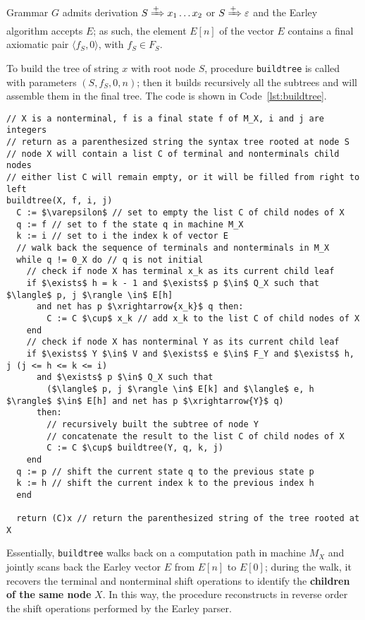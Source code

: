 \documentclass[english]{article}
\begin{document}
Grammar \(G\) admits derivation \(S \xRightarrow{+} x_1 \ldots x_2\) or \(S \xRightarrow{+} \varepsilon\) and the Earley algorithm accepts \(E\);
as such, the element \(E[n]\) of the vector \(E\) contains a final axiomatic pair \(\langle f_S, 0 \rangle\), with \(f_S \in F_S\).

To build the tree of string \(x\) with root node \(S\), procedure \texttt{buildtree} is called with parameters \((S, f_S, 0, n)\);
then it builds recursively all the subtrees and will assemble them in the final tree.
The code is shown in Code~\ref{lst:buildtree}.

\begin{lstlisting}[caption={\texttt{buildtree} procedure}, label={lst:buildtree}]
// X is a nonterminal, f is a final state f of M_X, i and j are integers
// return as a parenthesized string the syntax tree rooted at node S
// node X will contain a list C of terminal and nonterminals child nodes
// either list C will remain empty, or it will be filled from right to left
buildtree(X, f, i, j)
  C := $\varepsilon$ // set to empty the list C of child nodes of X
  q := f // set to f the state q in machine M_X
  k := i // set to i the index k of vector E
  // walk back the sequence of terminals and nonterminals in M_X
  while q != 0_X do // q is not initial
    // check if node X has terminal x_k as its current child leaf
    if $\exists$ h = k - 1 and $\exists$ p $\in$ Q_X such that $\langle$ p, j $\rangle \in$ E[h]
      and net has p $\xrightarrow{x_k}$ q then:
        C := C $\cup$ x_k // add x_k to the list C of child nodes of X
    end
    // check if node X has nonterminal Y as its current child leaf
    if $\exists$ Y $\in$ V and $\exists$ e $\in$ F_Y and $\exists$ h, j (j <= h <= k <= i)
      and $\exists$ p $\in$ Q_X such that
        ($\langle$ p, j $\rangle \in$ E[k] and $\langle$ e, h $\rangle$ $\in$ E[h] and net has p $\xrightarrow{Y}$ q)
      then:
        // recursively built the subtree of node Y
        // concatenate the result to the list C of child nodes of X
        C := C $\cup$ buildtree(Y, q, k, j)
    end
  q := p // shift the current state q to the previous state p
  k := h // shift the current index k to the previous index h
  end

  return (C)x // return the parenthesized string of the tree rooted at X
\end{lstlisting}

Essentially, \texttt{buildtree} walks back on a computation path in machine \(M_X\) and jointly scans back the Earley vector \(E\) from \(E[n]\) to \(E[0]\);
during the walk, it recovers the terminal and nonterminal shift operations to identify the \textbf{children of the same node} \(X\).
In this way, the procedure reconstructs in reverse order the shift operations performed by the Earley parser.
\end{document}
